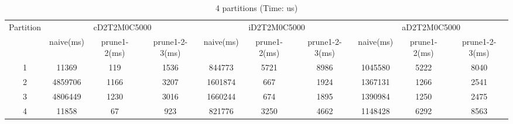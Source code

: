 \begin{table*}[t]
  \centering
\makeatletter
    \long{}
\makeatother
  \caption{4 partitions (Time: us)}
    \vspace*{3pt}
  \footnotesize

  \label{table:partition4}
  \begin{tabular}{|c||c|c|c|c|c|c|c|c|c|}
  \hline
  \multirow{2}{*}{Partition} &  \multicolumn{3}{|c|}{cD2T2M0C5000} & \multicolumn{3}{|c|}{iD2T2M0C5000} &\multicolumn{3}{|c|}{aD2T2M0C5000} \\\cline{2-10}
    &  naive(ms) & prune1-2(ms) & prune1-2-3(ms) & naive(ms) & prune1-2(ms) & prune1-2-3(ms) & naive(ms) & prune1-2(ms) & prune1-2-3(ms) \\\hline \hline

\cline{2-10}
    1 &  11369 & 119 & 1536 & 844773 & 5721 & 8986 & 1045580 & 5222 & 8040 \\\hline

\cline{2-10}
    2 &  4859706 & 1166 & 3207 & 1601874 & 667 & 1924 & 1367131 & 1266 & 2541 \\\hline

\cline{2-10}
    3 &  4806449 & 1230 & 3016 & 1660244 & 674 & 1895 & 1390984 & 1250 & 2475 \\\hline
    
\cline{2-10}
    4 &  11858 & 67 & 923 & 821776 & 3250 & 4662 & 1148428 & 6292 & 8563 \\\hline
    
  \end{tabular}
  \vspace*{-17pt}
\end{table*}




